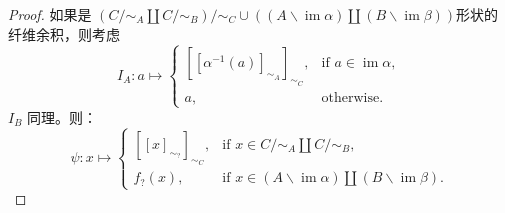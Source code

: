 \begin{itemize}
\begin{proof}{}
              如果是 \((C/\mathord\sim_A \amalg C/\mathord\sim_B) / \mathord \sim_C \cup((A\backslash\! \operatorname{im}\alpha )\amalg (B\backslash\! \operatorname{im}\beta  ))\)形状的纤维余积，则考虑
              \[
                  I_A : a\mapsto \begin{cases}
                      \left[ [\alpha ^{-1} (a)]_{\sim_A} \right] _{\sim_C}, & \text{if }a\in \operatorname{im}\alpha , \\
                      a,                                                    & \text{otherwise}.
                  \end{cases}
              \]
              \(I_B\) 同理。则：
              \[
                  \psi :x\mapsto \begin{cases}
                      [[x]_{\sim_?}]_{\sim_C}, & \text{if }x \in C/\mathord\sim_A \amalg C/\mathord\sim_B,                                                \\
                      f_?(x),                  & \text{if } x\in (A\backslash\! \operatorname{im}\alpha )\amalg (B\backslash\! \operatorname{im}\beta  ).
                  \end{cases}
              \]
          \end{proof}

\end{itemize}

